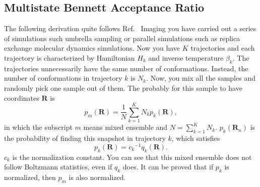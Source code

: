 \subsection{Multistate Bennett Acceptance Ratio\label{Sec:FEM:MBAR}}
The following derivation quite follows Ref.~\cite{ShirtsarXiv2017}
Imaging you have carried out a series of simulations such umbrella sampling or parallel simulations such as replica exchange molecular dynamics simulations.
Now you have $K$ trajectories and each trajectory is characterized by Hamiltonian $H_k$ and inverse temperature $\beta_k$. The trajectories unnecessarily have the same number of conformations. Instead, the number of conformations in trajectory $k$ is $N_k$. Now, you mix all the samples and randomly pick one sample out of them. The probably for this sample to have coordinates $\mathbf{R}$ is 
\begin{equation}
p_m(\mathbf{R})=\frac 1N\sum_{k=1}^{K}N_kp_k(\mathbf{R}),
\end{equation}
in which the subscript $m$ means mixed ensemble and $N=\sum\limits_{k=1}^{K}N_k$. $p_k(\mathbf{R}_n)$ is the probability of finding this snapshot in trajectory $k$, which satisfies
\begin{equation}
p_k(\mathbf{R})={c_k}^{-1}q_k(\mathbf{R}).
\end{equation}
$c_k$ is the normalization constant. You can see that this mixed ensemble does not follow Boltzmann statistics, even if $q_k$ does. It can be proved that if $p_k$ is normalized, then $p_m$ is also normalized.

